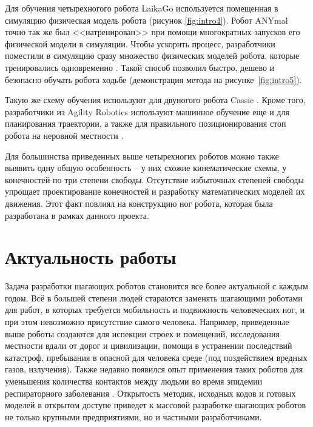 Для обучения четырехногого робота LaikaGo используется помещенная в симуляцию физическая модель робота \cite{LaikaGo2019} (рисунок \ref{fig:intro4}). Робот ANYmal точно так же был <<натренирован>> при помощи многократных запусков его физической модели в симуляции. Чтобы ускорить процесс, разработчики поместили в симуляцию сразу множество физических моделей робота, которые тренировались одновременно \cite{RoboSysLab2019}. Такой способ позволил быстро, дешево и безопасно обучать робота ходьбе (демонстрация метода на рисунке~\ref{fig:intro5}). 

Такую же схему обучения используют для двуногого робота Cassie \cite{AgilityRobo2018}. Кроме того, разработчики из Agility Robotics используют машинное обучение еще и для планирования траектории, а также для правильного позиционирования стоп робота на неровной местности \cite{Agility2020}.

Для большинства приведенных выше четырехногих роботов можно также выявить одну общую особенность -- у них схожие кинематические схемы, у конечностей по три степени свободы. Отсутствие избыточных степеней свободы упрощает проектирование конечностей и разработку математических моделей их движения. Этот факт повлиял на конструкцию ног робота, которая была разработана в рамках данного проекта.

\section*{Актуальность работы}

Задача разработки шагающих роботов становится все более актуальной с каждым годом. Всё в большей степени людей стараются заменять шагающими роботами для работ, в которых требуется мобильность и подвижность человеческих ног, и при этом невозможно присутствие самого человека. Например, приведенные выше роботы создаются для испекции строек и помещений, исследования местности вдали от дорог и цивилизации, помощи в устранении последствий катастроф, пребывания в опасной для человека среде (под поздействием вредных газов, излучения). Также недавно появился опыт применения таких роботов для уменьшения количества контактов между людьми во время эпидемии респираторного заболевания \cite{Bbc2020}. Открытость методик, исходных кодов и готовых моделей в открытом доступе приведет к массовой разработке шагающих роботов не только крупными предприятиями, но и частными разработчиками. 

